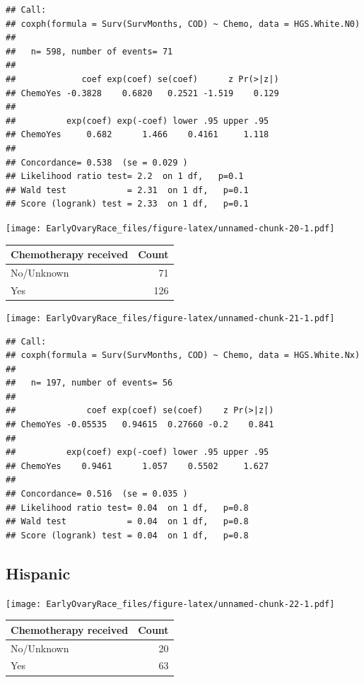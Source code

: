 \documentclass[
]{article}
\begin{document}
\begin{verbatim}
## Call:
## coxph(formula = Surv(SurvMonths, COD) ~ Chemo, data = HGS.White.N0)
## 
##   n= 598, number of events= 71 
## 
##             coef exp(coef) se(coef)      z Pr(>|z|)
## ChemoYes -0.3828    0.6820   0.2521 -1.519    0.129
## 
##          exp(coef) exp(-coef) lower .95 upper .95
## ChemoYes     0.682      1.466    0.4161     1.118
## 
## Concordance= 0.538  (se = 0.029 )
## Likelihood ratio test= 2.2  on 1 df,   p=0.1
## Wald test            = 2.31  on 1 df,   p=0.1
## Score (logrank) test = 2.33  on 1 df,   p=0.1
\end{verbatim}

\texttt{[image: EarlyOvaryRace\_files/figure-latex/unnamed-chunk-20-1.pdf]}

\begin{tabular}[t]{l|r}
\hline
Chemotherapy received & Count\\
\hline
No/Unknown & 71\\
\hline
Yes & 126\\
\hline
\end{tabular}

\texttt{[image: EarlyOvaryRace\_files/figure-latex/unnamed-chunk-21-1.pdf]}

\begin{verbatim}
## Call:
## coxph(formula = Surv(SurvMonths, COD) ~ Chemo, data = HGS.White.Nx)
## 
##   n= 197, number of events= 56 
## 
##              coef exp(coef) se(coef)    z Pr(>|z|)
## ChemoYes -0.05535   0.94615  0.27660 -0.2    0.841
## 
##          exp(coef) exp(-coef) lower .95 upper .95
## ChemoYes    0.9461      1.057    0.5502     1.627
## 
## Concordance= 0.516  (se = 0.035 )
## Likelihood ratio test= 0.04  on 1 df,   p=0.8
## Wald test            = 0.04  on 1 df,   p=0.8
## Score (logrank) test = 0.04  on 1 df,   p=0.8
\end{verbatim}

\hypertarget{hispanic}{%
\subsection{Hispanic}\label{hispanic}}

\texttt{[image: EarlyOvaryRace\_files/figure-latex/unnamed-chunk-22-1.pdf]}

\begin{tabular}[t]{l|r}
\hline
Chemotherapy received & Count\\
\hline
No/Unknown & 20\\
\hline
Yes & 63\\
\hline
\end{tabular}
\end{document}
